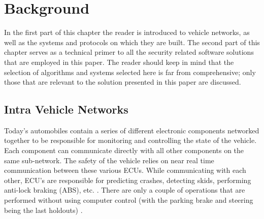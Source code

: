 
\chapter{Background}
\label{chap:background}

In the first part of this chapter the reader is introduced to vehicle networks, as well as the systems and protocols on which they are built. The second part of this chapter serves as a technical primer to all the security related software solutions that are employed in this paper. The reader should keep in mind that the selection of algorithms and systems selected here is far from comprehensive; only those that are relevant to the solution presented in this paper are discussed.   

\section{Intra Vehicle Networks}
\label{sec:vni}
Today's automobiles contain a series of different electronic components networked together to be responsible for monitoring and controlling the state of the vehicle. Each component can communicate directly with all other components on the same sub-network. The safety of the vehicle relies on near real time communication between these various ECUs. While communicating with each other, ECU's are responsible for predicting crashes, detecting skids, performing anti-lock braking (ABS), etc. \cite{Yadav16}. There are only a couple of operations that are performed without using computer control (with the parking brake and steering being the last holdouts) \cite{Kosher}. 

